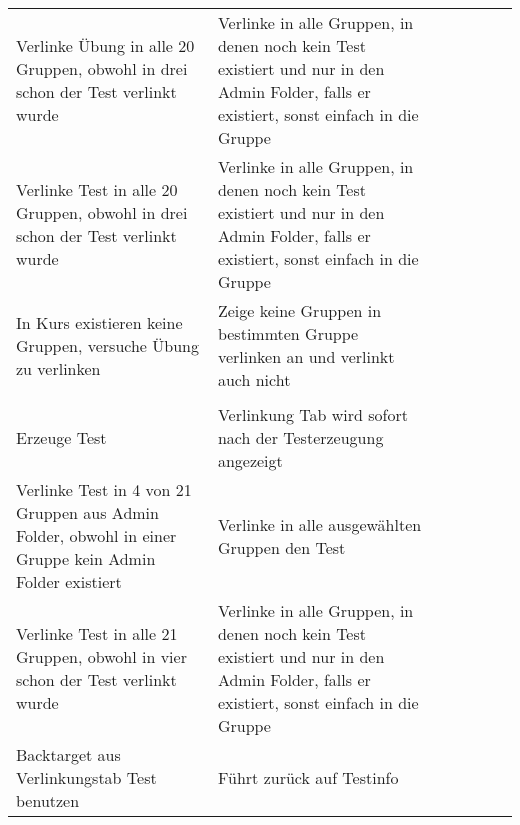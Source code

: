 \begin{table}[]
\begin{tabular}{p{6cm}p{7cm}p{3cm}llll}
		Verlinke Übung in alle 20 Gruppen, obwohl in drei schon der Test verlinkt wurde                                                       & Verlinke in alle Gruppen, in denen noch kein Test existiert und nur in den Admin Folder, falls er existiert, sonst einfach in die Gruppe                            & \checkmark           &  &  &  \\Verlinke Test in alle 20 Gruppen, obwohl in drei schon der Test verlinkt wurde                                                        & Verlinke in alle Gruppen, in denen noch kein Test existiert und nur in den Admin Folder, falls er existiert, sonst einfach in die Gruppe                            & \checkmark           &  &  &  \\
		In Kurs existieren keine Gruppen, versuche Übung zu verlinken                                                                         & Zeige keine Gruppen in bestimmten Gruppe verlinken an und verlinkt auch nicht                                                                                    & \checkmark           &  &  &  \\
		&                                                                                                                                                                  &             &  &  &  \\
		Erzeuge Test                                                                                                                         & Verlinkung Tab wird sofort nach der Testerzeugung angezeigt                                                                                                      & \checkmark           &  &  &  \\
		Verlinke Test in 4 von 21 Gruppen aus Admin Folder, obwohl in einer Gruppe kein Admin Folder existiert                               & Verlinke in alle ausgewählten Gruppen den Test                                                                                                                   & \checkmark           &  &  &  \\
		Verlinke Test in alle 21 Gruppen, obwohl in vier schon der Test verlinkt wurde                                                        & Verlinke in alle Gruppen, in denen noch kein Test existiert und nur in den Admin Folder, falls er existiert, sonst einfach in die Gruppe                            & \checkmark           &  &  &  \\
		Backtarget aus Verlinkungstab Test benutzen                                                                                          & Führt zurück auf Testinfo                                                                                                                                        & \checkmark           &  &  &  \\

\end{tabular}
\end{table}
